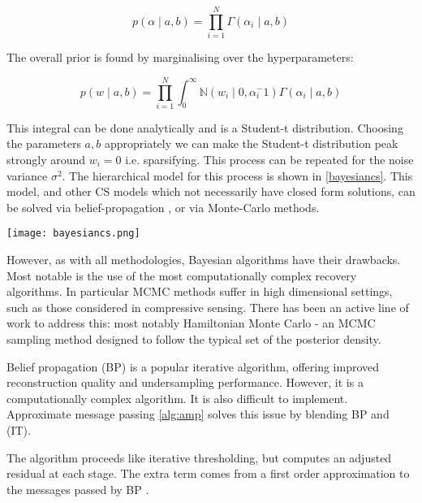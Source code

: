 \begin{equation}
p\left(\alpha \mid a, b \right) = \prod_{i=1}^{N} \Gamma\left( \alpha_i \mid a, b \right)
\end{equation}

The overall prior is found by marginalising over the hyperparameters:

\begin{equation}
p\left( w \mid a, b \right) = \prod_{i=1}^{N} \int_{0}^{\infty} \mathbb{N}\left(w_i\mid 0, \alpha_{i}^-1\right) \Gamma\left( \alpha_i \mid a, b \right)
\end{equation}

This integral can be done analytically and is a Student-t distribution. Choosing the parameters \(a,b\) appropriately we can make the Student-t distribution peak strongly around \(w_i = 0\) i.e. sparsifying. This process can be repeated for the noise variance \(\sigma^2\). The hierarchical model for this process is shown in \ref{bayesiancs}. This model, and other CS models which not necessarily have closed form solutions, can be solved via belief-propagation \cite{Baron2010}, or via Monte-Carlo methods.

\begin{figure*}[h]
\centering
\texttt{[image: bayesiancs.png]}
\caption{The hierarchical model for the Bayesian CS formulation \cite{Ji2008}}
\label{bayesiancs}
\end{figure*}

However, as with all methodologies, Bayesian algorithms have their drawbacks. Most notable is the use of the most computationally complex recovery algorithms. In particular MCMC methods suffer in high dimensional settings, such as those considered in compressive sensing. There has been an active line of work to address this: most notably Hamiltonian Monte Carlo - an MCMC sampling method designed to follow the typical set of the posterior density. 

Belief propagation (BP) \cite{Yedidia2011} is a popular iterative algorithm, offering improved reconstruction quality and undersampling performance. However, it is a computationally complex algorithm. It is also difficult to implement. Approximate message passing \eqref{alg:amp} solves this issue by blending BP and (IT).

The algorithm proceeds like iterative thresholding, but computes an adjusted residual at each stage. The extra term comes from a first order approximation to the messages passed by BP \cite{metzler2014denoising}.

